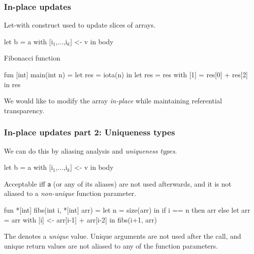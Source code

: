 \documentclass{beamer}
\renewcommand{\emph}[1]{\textcolor{structure}{#1}}
\newcommand{\emp}[1]{\textcolor{DikuRed}{ #1}}
\newcommand{\mymath}[1]{$ #1 $}
\newcommand{\myindx}[1]{_{#1}}
\begin{document}





\begin{frame}[fragile,t]
  \frametitle{In-place updates}

  Let-with construct used to update slices of arrays.

  \begin{colorcode}
    let b = a with [i\mymath{\myindx{1}},...,i\mymath{\myindx{k}}] <- v
    in body
  \end{colorcode}

  \pause

  \begin{block}{Fibonacci function}
    \begin{colorcode}
fun [int] main(int n) =
  let res = iota(n) in
  let res = res with [1] = res[0] + res[2]
  in res
    \end{colorcode}
  \end{block}

  We would like to modify the array {\em in-place} while maintaining
  referential transparency.

\end{frame}

\begin{frame}[fragile,t]
  \frametitle{In-place updates part 2: Uniqueness types}

  We can do this by aliasing analysis and {\em uniqueness types}.

  \begin{colorcode}
    let b = a with [i\mymath{\myindx{1}},...,i\mymath{\myindx{k}}] <- v
    in body
  \end{colorcode}

  Acceptable iff {\tt a} (or any of its aliases) are not used
  afterwards, and it is not aliased to a {\it non-unique} function
  parameter.

  \begin{colorcode}
    fun \emp{*}[int] fibs(int i, \emp{*}[int] arr) =
      let n = size(arr) in
      if i == n
        then arr
        else
          let arr = arr with [i] <- arr[i-1] + arr[i-2] in
          fibs(i+1, arr)
  \end{colorcode}

  The {\tt *} denotes a {\em unique} value.  Unique arguments are not
  used after the call, and unique return values are not aliased to any
  of the function parameters.

\end{frame}
\end{document}
